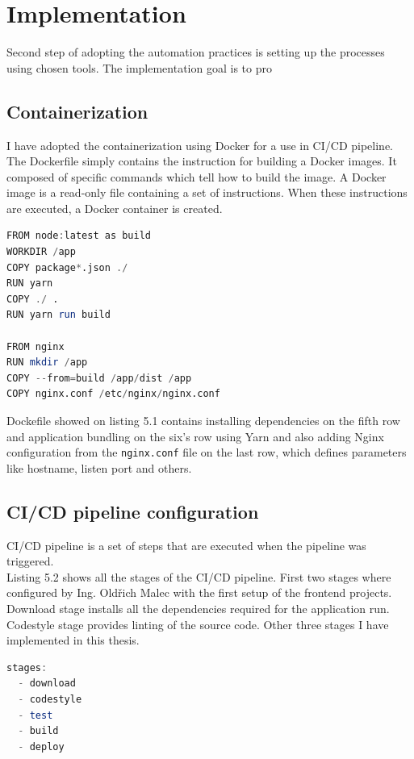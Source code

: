 \section{Implementation} Second step of adopting the automation practices is setting up the processes using chosen tools. The implementation goal is to pro


\subsection{Containerization}  I have adopted the containerization using Docker for a use in CI/CD pipeline. The Dockerfile simply contains the instruction for building a Docker images. It composed of specific commands which tell how to build the image. A Docker image is a read-only file containing a set of instructions. When these instructions are executed, a Docker container is created. 


\begin{lstlisting}[language=Octave, caption=Dockerfile]
FROM node:latest as build
WORKDIR /app
COPY package*.json ./
RUN yarn
COPY ./ .
RUN yarn run build

FROM nginx
RUN mkdir /app
COPY --from=build /app/dist /app
COPY nginx.conf /etc/nginx/nginx.conf
\end{lstlisting}

\noindent Dockefile showed on listing 5.1 contains installing dependencies on the fifth row and application bundling on the six's row using Yarn and also adding Nginx configuration from the \texttt{nginx.conf} file on the last row, which defines parameters like hostname, listen port and others.



\subsection{CI/CD pipeline configuration} CI/CD pipeline is a set of steps that are executed when the pipeline was triggered.\\
Listing 5.2 shows all the stages of the CI/CD pipeline. First two stages where configured by Ing. Oldřich Malec with the first setup of the frontend projects. Download stage installs all the dependencies required for the application run. Codestyle stage provides linting of the source code. Other three stages I have implemented in this thesis.
\begin{lstlisting}[language=Octave, caption=Gitlab CI/CD stages]
stages:
  - download
  - codestyle
  - test
  - build
  - deploy
\end{lstlisting}


